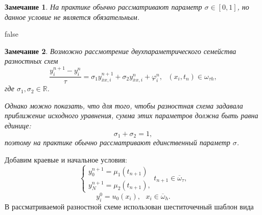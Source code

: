 \documentclass[11pt,a4paper,twoside]{report}
\numberwithin{equation}{section}
\theoremstyle{definition}
\theoremstyle{plain}
\newtheorem{note}{Замечание}[section]
\begin{document}
%
\begin{note}
%
    На практике обычно рассматривают параметр $\sigma \in [0, 1]$,
    но данное условие не является обязательным.
%
\end{note}
\ifx false
\begin{note}
%
    Возможно рассмотрение двухпараметрического семейства разностных схем
    $$
        \dfrac{y_i^{n+1} - y_i^n}{\tau} = \sigma_1 y_{\overline{x}x,i}^{n+1} +
        \sigma_2 y_{\overline{x}x,i}^n + \varphi_i^n, ~~~(x_i,t_n)\in\omega_{\tau h},
    $$
    где $\sigma_1, \sigma_2 \in\mathbb{R}$.

    Однако можно показать, что для того, чтобы разностная схема задавала приближение
    исходного уравнения,
    сумма этих параметров должна быть равна единице:
    $$
        \sigma_1 + \sigma_2 = 1,
    $$
    поэтому на практике обычно рассматривают единственный параметр $\sigma$.
%
\end{note}
%
\fi
Добавим краевые и начальное условия:
%
\begin{equation}
%
    \label{bord_diskr_5}
    \begin{cases}
        y_0^{n+1} = \mu_1(t_{n+1}) \\
        y_N^{n+1} = \mu_2(t_{n+1}),
    \end{cases}
    t_{n+1}\in \overline{\omega}_{\tau},
%
\end{equation}
%
%
\begin{equation}
%
    \label{start_diskr_5}
    y_i^0 = u_0(x_i),~~~x_i\in \overline{\omega}_h.
%
\end{equation}
%
В рассматриваемой разностной схеме использован шеститочечный шаблон вида
%
\begin{figure}[H]
\centering
{}
\end{figure}
%
\end{document}
